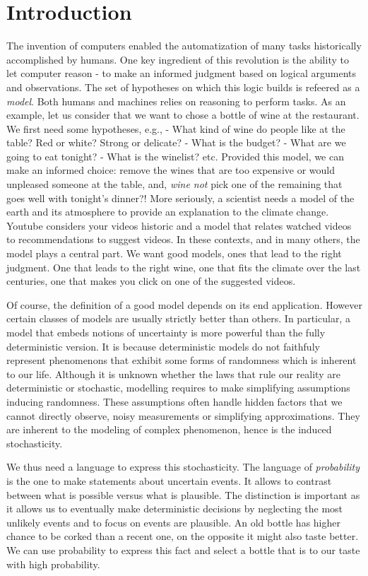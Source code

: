 \section{Introduction}
The invention of computers enabled the automatization of many tasks historically accomplished by humans.
One key ingredient of this revolution is the ability to let computer reason - to make an informed judgment based on logical arguments and observations.
The set of hypotheses on which this logic builds is refeered as a \textit{model}. Both humans and machines relies on reasoning to perform tasks. As an example, let us consider that we want to chose a bottle of wine at the restaurant. We first need some hypotheses, e.g., - What kind of wine do people like at the table? Red or white? Strong or delicate? - What is the budget? - What are we going to eat tonight? - What is the winelist? etc. Provided this model, we can make an informed choice: remove the wines that are too expensive or would unpleased someone at the table, and, \textit{wine not} pick one of the remaining that goes well with tonight's dinner?! More seriously, a scientist needs a model of the earth and its atmosphere to provide an explanation to the climate change. Youtube considers your videos historic and a model that relates watched videos to recommendations to suggest videos. In these contexts, and in many others, the model plays a central part. We want good models, ones that lead to the right judgment. One that leads to the right wine, one that fits the climate over the last centuries, one that makes you click on one of the suggested videos.

Of course, the definition of a good model depends on its end application. However certain classes of models are usually strictly better than others.
In particular, a model that embeds notions of uncertainty is more powerful than the fully deterministic version. It is because deterministic models do not faithfuly represent phenomenons that exhibit some forms of randomness which is inherent to our life. Although it is unknown whether the laws that rule our reality are deterministic or stochastic, modelling requires to make simplifying assumptions inducing randomness. These assumptions often handle hidden factors that we cannot directly observe, noisy measurements or simplifying approximations. They are inherent to the modeling of complex phenomenon, hence is the induced stochasticity.

We thus need a language to express this stochasticity. The language of \textit{probability} is the one to make statements about uncertain events. It allows to contrast between what is possible versus what is plausible. The distinction is important as it allows us to eventually make deterministic decisions by neglecting the most unlikely events and to focus on events are plausible. An old bottle has higher chance to be corked than a recent one, on the opposite it might also taste better. We can use probability to express this fact and select a bottle that is to our taste with high probability.

